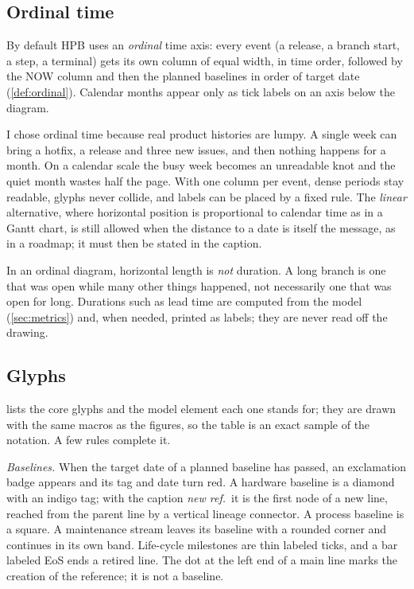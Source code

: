 \subsection{Ordinal time}
\label{sec:notation-time}

By default HPB uses an \emph{ordinal} time axis: every event (a release, a
branch start, a step, a terminal) gets its own column of equal width, in
time order, followed by the NOW column and then the planned baselines in
order of target date (\cref{def:ordinal}). Calendar months appear only as
tick labels on an axis below the diagram.

I chose ordinal time because real product histories are lumpy. A single
week can bring a hotfix, a release and three new issues, and then nothing
happens for a month. On a calendar scale the busy week becomes an
unreadable knot and the quiet month wastes half the page. With one column
per event, dense periods stay readable, glyphs never collide, and labels
can be placed by a fixed rule. The \emph{linear} alternative, where
horizontal position is proportional to calendar time as in a Gantt chart,
is still allowed when the distance to a date is itself the message, as in
a roadmap; it must then be stated in the caption.

\begin{remark}
  \label{rem:ordinal}
  In an ordinal diagram, horizontal length is \emph{not} duration. A long
  branch is one that was open while many other things happened, not
  necessarily one that was open for long. Durations such as lead time are
  computed from the model (\cref{sec:metrics}) and, when needed, printed
  as labels; they are never read off the drawing.
\end{remark}

\subsection{Glyphs}
\label{sec:notation-glyphs}

 lists the core glyphs and the model element each one
stands for; they are drawn with the same macros as the figures, so the
table is an exact sample of the notation. A few rules complete it.

\emph{Baselines.} When the target date of a planned baseline has passed, an
exclamation badge appears and its tag and date turn red. A hardware
baseline is a diamond with an indigo tag; with the caption \emph{new ref.}\
it is the first node of a new line, reached from the parent line by a
vertical lineage connector. A process baseline is a square. A maintenance
stream leaves its baseline with a rounded corner and continues in its own
band. Life-cycle milestones are thin labeled ticks, and a bar labeled
\textsf{EoS} ends a retired line. The dot at the left end of a main line
marks the creation of the reference; it is not a baseline.

